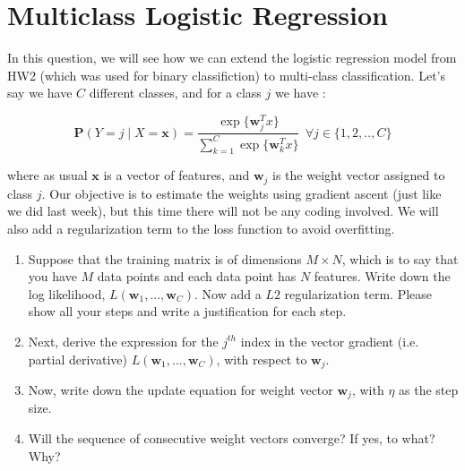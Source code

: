 \newcommand{\pr}{\mathbf{P}}  %
\newcommand{\vw}{\mathbf{w}}
\newcommand{\vx}{\mathbf{x}}

\section{Multiclass Logistic Regression}
In this question, we will see how we can extend the logistic regression model from HW2 (which was used for binary classifiction) to multi-class classification. Let's say we have $C$ different classes, and for a class $j$ we have :

$$ \pr(Y = j \mid X = \mathbf{x}) = \frac{\exp\{\vw_j^Tx\}}{\sum_{k=1}^{C} \exp\{\vw_k^Tx\}}  \ \ \forall j \in \{1, 2, .., C\}$$

where as usual $\mathbf{x}$ is a vector of features, and $\vw_j$ is the weight vector assigned to class $j$. Our objective is to estimate the weights using gradient ascent (just like we did last week), but this time there will not be any coding involved. We will also add a regularization term to the loss function to avoid overfitting.

\begin{enumerate}
\item Suppose that the training matrix is of dimensions $M \times N$, which is to say that you have $M$ data points and each data point has $N$ features. Write down the log likelihood, $L(\vw_1, ..., \vw_C)$. Now add a $L2$ regularization term. Please show all your steps and write a justification for each step.

\item Next, derive the expression for the $j^{th}$ index in the vector gradient (i.e. partial derivative) $L(\vw_1, ..., \vw_C)$, with respect to $\vw_j$.

\item Now, write down the update equation for weight vector $\vw_j$, with $\eta$ as the step size.

\item Will the sequence of consecutive weight vectors converge? If yes, to what? Why?

\end{enumerate}











